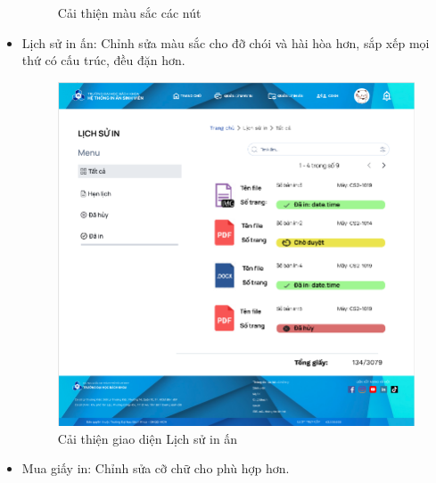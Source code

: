 \begin{itemize}
\begin{figure}[H]
\begin{center}
            \caption{Cải thiện màu sắc các nút}
        \end{center}
    \end{figure}
    \item Lịch sử in ấn: Chỉnh sửa màu sắc cho đỡ chói và hài hòa hơn, sắp xếp mọi thứ có cấu trúc, đều đặn hơn.
    \begin{figure}[H]
        \begin{center}
            \includegraphics[width=1\textwidth]{Images/Test/fix_history.png}
            \caption{Cải thiện giao diện Lịch sử in ấn}
        \end{center}
    \end{figure}
    \item Mua giấy in: Chỉnh sửa cỡ chữ cho phù hợp hơn.
    \begin{figure}[H]
        \begin{center}

\end{center}
\end{figure}
\end{itemize}
